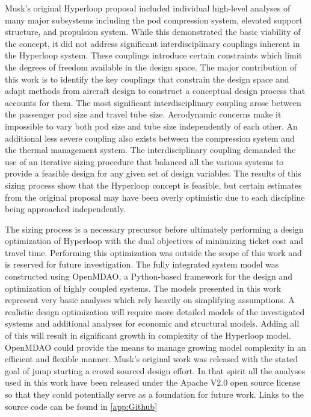 \documentclass[heading.tex]{subfiles}
\begin{document}
Musk's original Hyperloop proposal included individual high-level analyses of many major subsystems including the pod compression system,
elevated support structure, and propulsion system. While this demonstrated the basic viability of the concept, it did not address
significant interdisciplinary couplings inherent in the Hyperloop system. These couplings introduce certain constraints which limit the 
degrees of freedom available in the design space. The major contribution of this work is to identify the key couplings that constrain the design space
and adapt methods from aircraft design to construct a conceptual design process that accounts for them. The most significant 
interdisciplinary coupling arose between the passenger pod size and travel tube size. Aerodynamic concerns make it impossible to vary 
both pod size and tube size independently of each other. An additional less severe coupling also exists between the compression system and 
the thermal management system. The interdisciplinary coupling demanded the use of an iterative sizing procedure that balanced 
all the various systems to provide a feasible design for any given set of design variables. The results of this sizing process show that
the Hyperloop concept is feasible, but certain estimates from the original proposal may have been overly optimistic due to each discipline being approached independently. 

The sizing process is a necessary precursor before ultimately performing a design optimization of 
Hyperloop with the dual objectives of minimizing ticket cost and travel time. Performing this optimization 
was outside the scope of this work and is reserved for future investigation. 
The fully integrated system model was constructed using OpenMDAO, a Python-based framework for 
the design and optimization of highly coupled systems\cite{GrayBenchmarking2013}. The models presented 
in this work represent very basic analyses which rely heavily on simplifying assumptions. A realistic design 
optimization will require more detailed models of the investigated systems and additional analyses for economic and 
structural models. Adding all of this will result in significant growth in complexity of the Hyperloop model. 
OpenMDAO could provide the means to manage growing model complexity 
in an efficient and flexible manner. Musk's original work was released with the stated goal of jump starting
a crowd sourced design effort. In that spirit all the analyses used in this work have been released under
the Apache V2.0 open source license so that they could potentially serve as a foundation for future work. 
Links to the source code can be found in \cref{app:Github}
\end{document}
